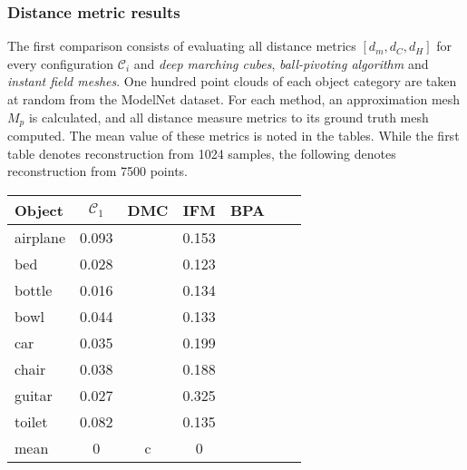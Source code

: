 \subsubsection*{Distance metric results}
    The first comparison consists of evaluating all distance metrics $[d_m, d_C, d_H]$ for every configuration
    $\mathcal{C}_i$ and \emph{deep marching cubes}, \emph{ball-pivoting algorithm} and \emph{instant field meshes}.
    One hundred point clouds of each object category are taken at random from the ModelNet dataset. For each method,
    an approximation mesh $M_{p}$ is calculated, and all distance measure metrics to its ground truth mesh computed.
    The mean value of these metrics is noted in the tables. While the first table denotes reconstruction from 1024 
    samples, the following denotes reconstruction from 7500 points.
\begin{center}
     \label{tab:distance1024} 
    \begin{tabular}{| l  | c  | c | c | c | c | c |}
        \hline
        Object& $\mathcal{C}_1$ & DMC & IFM & BPA \\ \hline
        \multirow{1}{*}{airplane}&0.093&&0.153&\\\hline
        \multirow{1}{*}{bed}&0.028&&0.123&\\\hline 
        \multirow{1}{*}{bottle}&0.016&&0.134&\\\hline
        \multirow{1}{*}{bowl}&0.044&&0.133&\\\hline
        \multirow{1}{*}{car}&0.035&&0.199&\\\hline
        \multirow{1}{*}{chair}&0.038&&0.188&\\\hline
        \multirow{1}{*}{guitar}&0.027&&0.325&\\\hline
        \multirow{1}{*}{toilet}&0.082&&0.135&\\\hline\hline
        \multirow{1}{*}{mean}&0&c&0&\\        \hline
    \end{tabular}
\end{center}
